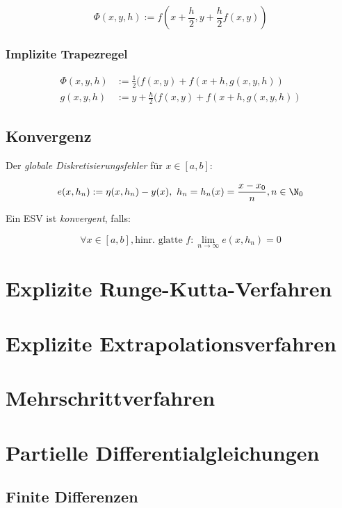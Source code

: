 $$\Phi(x,y,h) := f(x + \frac{h}{2}, y + \frac{h}{2} f(x,y) )$$

\subsubsection*{Implizite Trapezregel}

\vspace*{-2mm}
\begin{align*}
	\Phi(x,y,h) &:= \frac{1}{2} (f(x,y) + f(x+h, g(x,y,h)) \\
	g(x,y,h) &:= y + \frac{h}{2} (f(x,y) + f(x+h,g(x,y,h))
\end{align*}

\subsection*{Konvergenz}

Der \emph{globale Diskretisierungsfehler} für $x \in [a,b]$:

\vspace*{-4mm}
$$e(x,h_n) := \eta(x,h_n) - y(x), \ h_n=h_n(x)=\frac{x-x_0}{n}, n \in \N_0$$

Ein ESV ist \emph{konvergent}, falls:

\vspace*{-4mm}
$$\forall x \in [a,b], \text{hinr. glatte } f : \lim_{n \to \infty} e(x,h_n) = 0$$

\section*{Explizite Runge-Kutta-Verfahren}

\section*{Explizite Extrapolationsverfahren}

\section*{Mehrschrittverfahren}

\section*{Partielle Differentialgleichungen}

\subsection*{Finite Differenzen}
